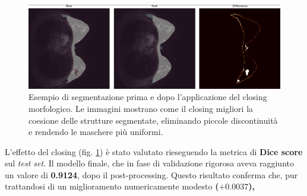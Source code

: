 \begin{figure}[H] 
  	\centering 
 	\includegraphics[width=\textwidth]{images/2025-08-08-18-52-24.png} 
    \caption{Esempio di segmentazione prima e dopo l'applicazione del closing morfologico. Le immagini mostrano come il closing migliori la coesione delle strutture segmentate, eliminando piccole discontinuità e rendendo le maschere più uniformi.}
    \label{fig:closing_example}
 \end{figure} 

L’effetto del closing (fig. \ref{fig:closing_example}) è stato valutato rieseguendo la metrica di \textbf{Dice score} sul \emph{test set}. Il modello finale, che in fase di validazione rigorosa aveva raggiunto un valore di \textbf{0.9124},  dopo il post-processing. Questo risultato conferma che, pur trattandosi di un miglioramento numericamente modesto \textbf{(\(+0.0037\)),} 



